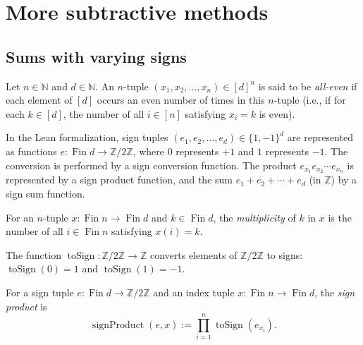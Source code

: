\section{More subtractive methods}

\subsection{Sums with varying signs}

\begin{definition}
\label{def.cancel.all-even}
\leanhelper
\leanok
Let $n\in\mathbb{N}$ and $d\in\mathbb{N}$. An
$n$-tuple $\left(  x_{1},x_{2},\ldots,x_{n}\right)  \in\left[  d\right]  ^{n}$
is said to be \emph{all-even} if each element of $\left[  d\right]  $ occurs
an even number of times in this $n$-tuple (i.e., if for each $k\in\left[
d\right]  $, the number of all $i\in\left[  n\right]  $ satisfying $x_{i}=k$
is even).
\end{definition}

In the Lean formalization, sign tuples $\left(e_1, e_2, \ldots, e_d\right) \in \{1, -1\}^d$
are represented as functions $e : \operatorname{Fin} d \to \mathbb{Z}/2\mathbb{Z}$,
where $0$ represents $+1$ and $1$ represents $-1$. The conversion is performed
by a sign conversion function. The product $e_{x_1} e_{x_2} \cdots e_{x_n}$
is represented by a sign product function, and the sum $e_1 + e_2 + \cdots + e_d$
(in $\mathbb{Z}$) by a sign sum function.

\begin{definition}
\label{def.cancel.multiplicity}
\leanhelper
\leanok
For an $n$-tuple $x : \operatorname{Fin} n \to \operatorname{Fin} d$ and
$k \in \operatorname{Fin} d$, the \emph{multiplicity} of $k$ in $x$ is the
number of all $i \in \operatorname{Fin} n$ satisfying $x(i) = k$.
\end{definition}

\begin{definition}
\label{def.cancel.toSign}
\leanhelper
\leanok
The function $\operatorname{toSign} : \mathbb{Z}/2\mathbb{Z} \to \mathbb{Z}$
converts elements of $\mathbb{Z}/2\mathbb{Z}$ to signs:
$\operatorname{toSign}(0) = 1$ and $\operatorname{toSign}(1) = -1$.
\end{definition}

\begin{definition}
\label{def.cancel.signProduct}
\leanhelper
\leanok
For a sign tuple $e : \operatorname{Fin} d \to \mathbb{Z}/2\mathbb{Z}$ and an
index tuple $x : \operatorname{Fin} n \to \operatorname{Fin} d$, the
\emph{sign product} is
\[
\operatorname{signProduct}(e, x) := \prod_{i=1}^{n} \operatorname{toSign}(e_{x_i}).
\]
\end{definition}

